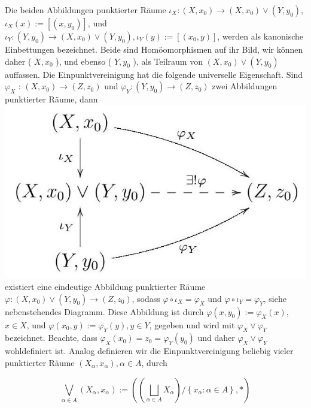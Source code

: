 \documentclass[10pt]{article}
\begin{document}
Die beiden Abbildungen punktierter Räume $\iota_{X}:\left(X, x_{0}\right) \rightarrow\left(X, x_{0}\right) \vee\left(Y, y_{0}\right)$, $\iota_{X}(x):=\left[\left(x, y_{0}\right)\right]$, und $\iota_{Y}:\left(Y, y_{0}\right) \rightarrow\left(X, x_{0}\right) \vee\left(Y, y_{0}\right), \iota_{Y}(y):=\left[\left(x_{0}, y\right)\right]$, werden als kanonische Einbettungen bezeichnet. Beide sind Homöomorphismen auf ihr Bild, wir können daher ( $X, x_{0}$ ), und ebenso ( $Y, y_{0}$ ), als Teilraum von $\left(X, x_{0}\right) \vee\left(Y, y_{0}\right)$ auffassen. Die Einpunktvereinigung hat die folgende universelle Eigenschaft. Sind $\varphi_{X}$ : $\left(X, x_{0}\right) \rightarrow\left(Z, z_{0}\right)$ und $\varphi_{Y}:\left(Y, y_{0}\right) \rightarrow\left(Z, z_{0}\right)$ zwei Abbildungen punktierter Räume, dann\\
\includegraphics[max width=\textwidth]{2025_06_05_d7ed2bacd1e9ce1db1f0g-031} existiert eine eindeutige Abbildung punktierter Räume $\varphi:\left(X, x_{0}\right) \vee\left(Y, y_{0}\right) \rightarrow\left(Z, z_{0}\right)$, sodass $\varphi \circ \iota_{X}=\varphi_{X}$ und $\varphi \circ \iota_{Y}=\varphi_{Y}$, siehe nebenstehendes Diagramm. Diese Abbildung ist durch $\varphi\left(x, y_{0}\right):=\varphi_{X}(x)$, $x \in X$, und $\varphi\left(x_{0}, y\right):=\varphi_{Y}(y), y \in Y$, gegeben und wird mit $\varphi_{X} \vee \varphi_{Y}$ bezeichnet. Beachte, dass $\varphi_{X}\left(x_{0}\right)=z_{0}=\varphi_{Y}\left(y_{0}\right)$ und daher $\varphi_{X} \vee \varphi_{Y}$ wohldefiniert ist. Analog definieren wir die Einpunktvereinigung beliebig vieler punktierter Räume $\left(X_{\alpha}, x_{\alpha}\right), \alpha \in A$, durch

$$
\bigvee_{\alpha \in A}\left(X_{\alpha}, x_{\alpha}\right):=\left(\left(\bigsqcup_{\alpha \in A} X_{\alpha}\right) /\left\{x_{\alpha}: \alpha \in A\right\}, *\right)
$$
\end{document}

